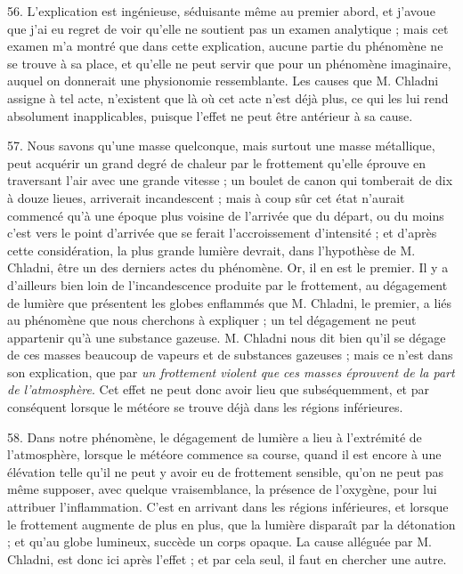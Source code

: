 \documentclass[a4paper, 11pt, oneside, polutonikogreek, french]{article}
\begin{document}
56. L'explication est ingénieuse, séduisante même au premier abord, et j'avoue que j'ai eu regret de voir qu'elle ne soutient pas un examen analytique ; mais cet examen m'a montré que dans cette explication, aucune partie du phénomène ne se trouve à sa place, et qu'elle ne peut servir que pour un phénomène imaginaire, auquel on donnerait une physionomie ressemblante. Les causes que M. Chladni assigne à tel acte, n'existent que là où cet acte n'est déjà plus, ce qui les lui rend absolument inapplicables, puisque l'effet ne peut être antérieur à sa cause.

57. Nous savons qu'une masse quelconque, mais surtout une masse métallique, peut acquérir un grand degré de chaleur par le frottement qu'elle éprouve en traversant l'air avec une grande vitesse ; un boulet de canon qui tomberait de dix à douze lieues, arriverait incandescent ; mais à coup sûr cet état n'aurait commencé qu'à une époque plus voisine de l'arrivée que du départ, ou du moins c'est vers le point d'arrivée que se ferait l'accroissement d'intensité ; et d'après cette considération, la plus grande lumière devrait, dans l'hypothèse de M. Chladni, être un des derniers actes du phénomène. Or, il en est le premier. Il y a d'ailleurs bien loin de l'incandescence produite par le frottement, au dégagement de lumière que présentent les globes enflammés que M. Chladni, le premier, a liés au phénomène que nous cherchons à expliquer ; un tel dégagement ne peut appartenir qu'à une substance gazeuse. M. Chladni nous dit bien qu'il se dégage de ces masses beaucoup de vapeurs et de substances gazeuses ; mais ce n'est dans son explication, que par \emph{un frottement violent que ces masses éprouvent de la part de l'atmosphère}. Cet effet ne peut donc avoir lieu que subséquemment, et par conséquent lorsque le météore se trouve déjà dans les régions inférieures.

58. Dans notre phénomène, le dégagement de lumière a lieu à l'extrémité de l'atmosphère, lorsque le météore commence sa course, quand il est encore à une élévation telle qu'il ne peut y avoir eu de frottement sensible, qu'on ne peut pas même supposer, avec quelque vraisemblance, la présence de l'oxygène, pour lui attribuer l'inflammation. C'est en arrivant dans les régions inférieures, et lorsque le frottement augmente de plus en plus, que la lumière disparaît par la détonation ; et qu'au globe lumineux, succède un corps opaque. La cause alléguée par M. Chladni, est donc ici après l'effet ; et par cela seul, il faut en chercher une autre.
\end{document}
